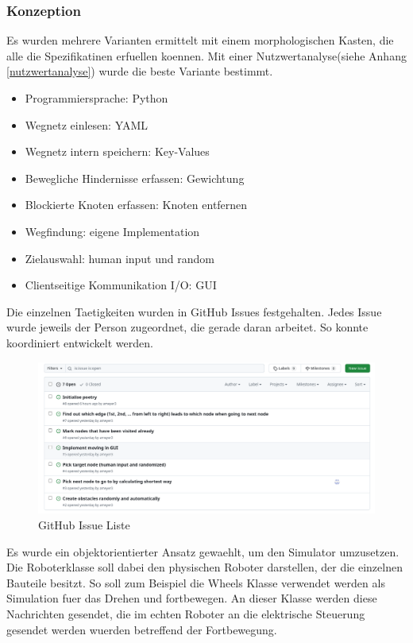 \subsubsection{Konzeption}

Es wurden mehrere Varianten ermittelt mit einem morphologischen Kasten, die alle die Spezifikatinen erfuellen koennen. Mit einer Nutzwertanalyse(siehe Anhang \ref{nutzwertanalyse}) wurde die beste Variante bestimmt.

\begin{itemize}
    \item Programmiersprache: Python
    \item Wegnetz einlesen: YAML
    \item Wegnetz intern speichern: Key-Values
    \item Bewegliche Hindernisse erfassen: Gewichtung
    \item Blockierte Knoten erfassen: Knoten entfernen
    \item Wegfindung: eigene Implementation
    \item Zielauswahl: human input und random
    \item Clientseitige Kommunikation I/O: GUI
\end{itemize}

Die einzelnen Taetigkeiten wurden in GitHub Issues festgehalten. Jedes Issue wurde jeweils der Person zugeordnet, die gerade daran arbeitet. So konnte koordiniert entwickelt werden.

\begin{figure}[H]
\centering
\includegraphics[width=\textwidth]{img/github-issues.png}
\caption{GitHub Issue Liste}
\label{fig:github-issues}
\end{figure}

Es wurde ein objektorientierter Ansatz gewaehlt, um den Simulator umzusetzen. Die Roboterklasse soll dabei den physischen Roboter darstellen, der die einzelnen Bauteile besitzt. So soll zum Beispiel die Wheels Klasse verwendet werden als Simulation fuer das Drehen und fortbewegen. An dieser Klasse werden diese Nachrichten gesendet, die im echten Roboter an die elektrische Steuerung gesendet werden wuerden betreffend der Fortbewegung.


